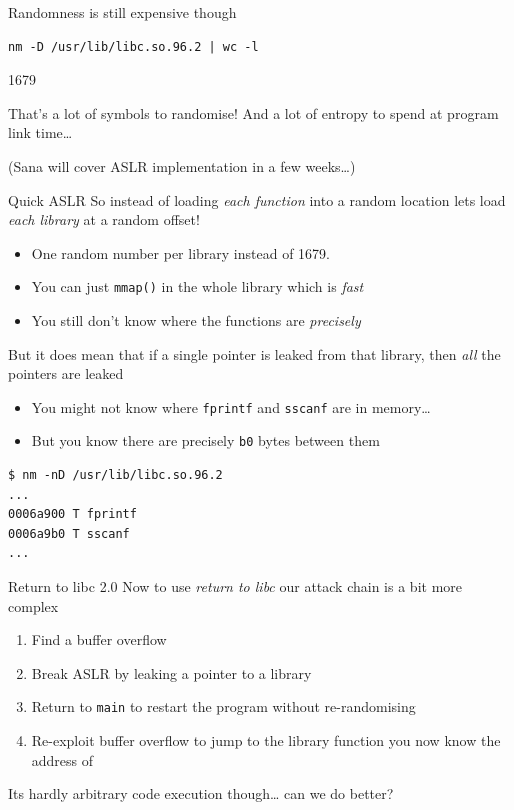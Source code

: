 \documentclass[9pt,aspectratio=169]{beamer}
\begin{document}
\begin{frame}[label={sec:orged2882d},fragile]{Randomness is still expensive though}
 \begin{lstlisting}[language=shell,numbers=none]
nm -D /usr/lib/libc.so.96.2 | wc -l
\end{lstlisting}
1679

That's a lot of symbols to randomise!
And a lot of entropy to spend at program link time\ldots{}

(Sana will cover ASLR implementation in a few weeks\ldots{})
\end{frame}
\begin{frame}[label={sec:org1ff206b},fragile]{Quick ASLR}
 So instead of loading \emph{each function} into a random location lets load \emph{each library} at a random offset!
\begin{itemize}
\item One random number per library instead of 1679.
\item You can just \texttt{mmap()} in the whole library which is \emph{fast}
\item You still don't know where the functions are \emph{precisely}
\end{itemize}

But it does mean that if a single pointer is leaked from that library, then \emph{all} the pointers are leaked
\begin{itemize}
\item You might not know where \texttt{fprintf} and \texttt{sscanf} are in memory\ldots{}
\item But you know there are precisely \texttt{b0} bytes between them
\end{itemize}
\begin{verbatim}
$ nm -nD /usr/lib/libc.so.96.2 
...
0006a900 T fprintf
0006a9b0 T sscanf
...
\end{verbatim}
\end{frame}
\begin{frame}[label={sec:orgccb9c3f},fragile]{Return to libc 2.0}
 Now to use \emph{return to libc} our attack chain is a bit more complex

\begin{enumerate}
\item Find a buffer overflow
\item Break ASLR by leaking a pointer to a library
\item Return to \texttt{main} to restart the program without re-randomising
\item Re-exploit buffer overflow to jump to the library function you now know the address of
\end{enumerate}

Its hardly arbitrary code execution though\ldots{} can we do better?
\end{frame}
\end{document}
